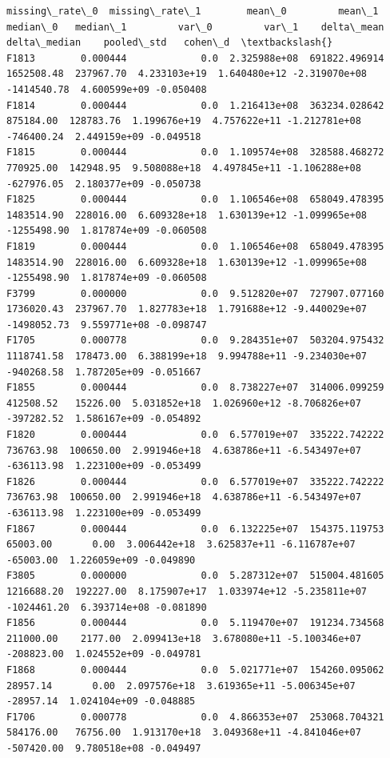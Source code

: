 \documentclass[11pt]{article}
\begin{document}
    
    \begin{Verbatim}[commandchars=\\\{\}]
       missing\_rate\_0  missing\_rate\_1        mean\_0         mean\_1    median\_0   median\_1         var\_0         var\_1    delta\_mean  delta\_median    pooled\_std   cohen\_d  \textbackslash{}
F1813        0.000444             0.0  2.325988e+08  691822.496914  1652508.48  237967.70  4.233103e+19  1.640480e+12 -2.319070e+08   -1414540.78  4.600599e+09 -0.050408   
F1814        0.000444             0.0  1.216413e+08  363234.028642   875184.00  128783.76  1.199676e+19  4.757622e+11 -1.212781e+08    -746400.24  2.449159e+09 -0.049518   
F1815        0.000444             0.0  1.109574e+08  328588.468272   770925.00  142948.95  9.508088e+18  4.497845e+11 -1.106288e+08    -627976.05  2.180377e+09 -0.050738   
F1825        0.000444             0.0  1.106546e+08  658049.478395  1483514.90  228016.00  6.609328e+18  1.630139e+12 -1.099965e+08   -1255498.90  1.817874e+09 -0.060508   
F1819        0.000444             0.0  1.106546e+08  658049.478395  1483514.90  228016.00  6.609328e+18  1.630139e+12 -1.099965e+08   -1255498.90  1.817874e+09 -0.060508   
F3799        0.000000             0.0  9.512820e+07  727907.077160  1736020.43  237967.70  1.827783e+18  1.791688e+12 -9.440029e+07   -1498052.73  9.559771e+08 -0.098747   
F1705        0.000778             0.0  9.284351e+07  503204.975432  1118741.58  178473.00  6.388199e+18  9.994788e+11 -9.234030e+07    -940268.58  1.787205e+09 -0.051667   
F1855        0.000444             0.0  8.738227e+07  314006.099259   412508.52   15226.00  5.031852e+18  1.026960e+12 -8.706826e+07    -397282.52  1.586167e+09 -0.054892   
F1820        0.000444             0.0  6.577019e+07  335222.742222   736763.98  100650.00  2.991946e+18  4.638786e+11 -6.543497e+07    -636113.98  1.223100e+09 -0.053499   
F1826        0.000444             0.0  6.577019e+07  335222.742222   736763.98  100650.00  2.991946e+18  4.638786e+11 -6.543497e+07    -636113.98  1.223100e+09 -0.053499   
F1867        0.000444             0.0  6.132225e+07  154375.119753    65003.00       0.00  3.006442e+18  3.625837e+11 -6.116787e+07     -65003.00  1.226059e+09 -0.049890   
F3805        0.000000             0.0  5.287312e+07  515004.481605  1216688.20  192227.00  8.175907e+17  1.033974e+12 -5.235811e+07   -1024461.20  6.393714e+08 -0.081890   
F1856        0.000444             0.0  5.119470e+07  191234.734568   211000.00    2177.00  2.099413e+18  3.678080e+11 -5.100346e+07    -208823.00  1.024552e+09 -0.049781   
F1868        0.000444             0.0  5.021771e+07  154260.095062    28957.14       0.00  2.097576e+18  3.619365e+11 -5.006345e+07     -28957.14  1.024104e+09 -0.048885   
F1706        0.000778             0.0  4.866353e+07  253068.704321   584176.00   76756.00  1.913170e+18  3.049368e+11 -4.841046e+07    -507420.00  9.780518e+08 -0.049497   


\end{Verbatim}
\end{document}
